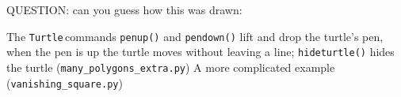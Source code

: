 \documentclass[11pt,a4paper]{scrartcl}
\newcommand{\turtle}{\texttt{Turtle}\,}
\begin{document}
QUESTION: can you guess how this was drawn:
\begin{center}
\end{center}
The \turtle commands \texttt{penup()} and \texttt{pendown()} lift and
drop the turtle's pen, when the pen is up the turtle moves without
leaving a line; \texttt{hideturtle()} hides the turtle (\texttt{many\_polygons\_extra.py})
A more complicated example (\texttt{vanishing\_square.py})
\begin{center}
\end{center}
\end{document}
